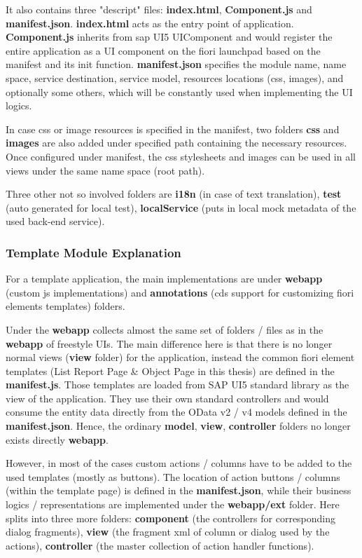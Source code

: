 It also contains three "descript" files: \textbf{index.html}, \textbf{Component.js} and \textbf{manifest.json}. \textbf{index.html} acts as the entry point of application.  \textbf{Component.js} inherits from sap UI5 UIComponent and would register the entire application as a UI component on the fiori launchpad based on the manifest and its init function. \textbf{manifest.json} specifies the module name, name space, service destination, service model, resources locations (css, images), and optionally some others, which will be constantly used when implementing the UI logics.

In case css or image resources is specified in the manifest, two folders \textbf{css} and \textbf{images} are also added under specified path containing the necessary resources. Once configured under manifest, the css stylesheets and images can be used in all views under the same name space (root path).

Three other not so involved folders are \textbf{i18n} (in case of text translation), \textbf{test} (auto generated for local test), \textbf{localService} (puts in local mock metadata of the used back-end service).

\subsubsection{Template Module Explanation}

For a template application, the main implementations are under \textbf{webapp} (custom js implementations) and \textbf{annotations} (cds support for customizing fiori elements templates) folders.

\bigskip
Under the \textbf{webapp} collects almost the same set of folders / files as in the \textbf{webapp} of freestyle UIs. The main difference here is that there is no longer normal views (\textbf{view} folder) for the application, instead the common fiori element templates (List Report Page \& Object Page in this thesis) are defined in the \textbf{manifest.js}. Those templates are loaded from SAP UI5 standard library as the view of the application. They use their own standard controllers and would consume the entity data directly from the OData v2 / v4 models defined in the \textbf{manifest.json}. Hence, the ordinary \textbf{model}, \textbf{view}, \textbf{controller} folders no longer exists directly \textbf{webapp}.

However, in most of the cases custom actions / columns have to be added to the used templates (mostly as buttons). The location of action buttons / columns (within the template page) is defined in the \textbf{manifest.json}, while their business logics / representations are implemented under the \textbf{webapp/ext} folder. Here splits into three more folders: \textbf{component} (the controllers for corresponding dialog fragments), \textbf{view} (the fragment xml of column or dialog used by the actions), \textbf{controller} (the master collection of action handler functions).


